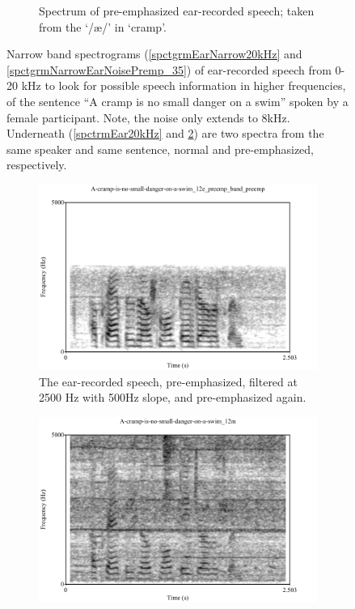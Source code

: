\begin{figure}[h!]
\begin{subfigure}{0.475\textwidth}
  \caption{Spectrum of pre-emphasized ear-recorded speech; taken from the `/\ae/' in `cramp'.}
  \label{spctrmEar20kPreemp}
\end{subfigure}
\caption{Narrow band spectrograms (\ref{spctgrmEarNarrow20kHz} and \ref{spctgrmNarrowEarNoisePremp_35}) of ear-recorded speech from 0-20 kHz to look for possible speech information in higher frequencies, of the sentence ``A cramp is no small danger on a swim'' spoken by a female participant. Note, the noise only extends to 8kHz. Underneath (\ref{spctrmEar20kHz} and \ref{spctrmEar20kPreemp}) are two spectra from the same speaker and same sentence, normal and pre-emphasized, respectively.}
\end{figure}

\begin{figure}[b!]
\centering
\begin{subfigure}{0.475\textwidth}
  \centering
  \includegraphics[width=1\linewidth]{figure/spctgrmNarrowEarNoisePrempFiltPremp.pdf}
  \caption{The ear-recorded speech, pre-emphasized, filtered at 2500 Hz with 500Hz slope, and pre-emphasized again.}
  \label{spctgrmNarrowEarNoisePrempFiltPremp_35}
\end{subfigure}%
\hfill
\begin{subfigure}{0.475\textwidth}
  \centering
  \includegraphics[width=1\linewidth]{figure/spctgrmNarrowMthNoise_35.pdf}

\end{subfigure}
\end{figure}
